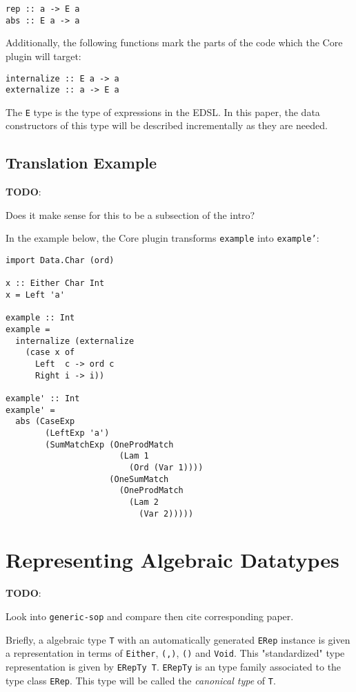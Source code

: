 \documentclass[sigplan,anonymous,review]{acmart}
\newcommand{\ttt}{\texttt}
\newenvironment{todo}
  {\begin{tcolorbox}
   \textbf{TODO}:
  }
  {\end{tcolorbox}
  }
\begin{document}
\begin{lstlisting}
rep :: a -> E a
abs :: E a -> a
\end{lstlisting}

Additionally, the following functions mark the parts of the code which the Core
plugin will target:

\begin{lstlisting}
internalize :: E a -> a
externalize :: a -> E a
\end{lstlisting}

The \ttt{E} type is the type of expressions in the EDSL.  In this paper, the
data constructors of this type will be described incrementally as they
are needed.

\subsection{Translation Example}
\begin{todo}
  Does it make sense for this to be a subsection of the intro?
\end{todo}

In the example below, the Core plugin transforms \ttt{example} into \ttt{example'}:
\begin{lstlisting}[deletekeywords={Ord}]
import Data.Char (ord)

x :: Either Char Int
x = Left 'a'

example :: Int
example =
  internalize (externalize
    (case x of
      Left  c -> ord c
      Right i -> i))

example' :: Int
example' =
  abs (CaseExp
        (LeftExp 'a')
        (SumMatchExp (OneProdMatch
                       (Lam 1
                         (Ord (Var 1))))
                     (OneSumMatch
                       (OneProdMatch
                         (Lam 2
                           (Var 2)))))
\end{lstlisting}

\section{Representing Algebraic Datatypes}

\begin{todo}
  Look into \ttt{generic-sop} and compare then cite corresponding paper.
\end{todo}

Briefly, a algebraic type \ttt{T} with an automatically generated \ttt{ERep}
instance is given a representation in terms of \ttt{Either}, \ttt{(,)}, \ttt{()}
and \ttt{Void}.  This "standardized" type representation is given by \ttt{ERepTy
T}. \ttt{ERepTy} is an type family associated to the type class \ttt{ERep}. This
type will be called the \textit{canonical type} of \ttt{T}.
\end{document}
